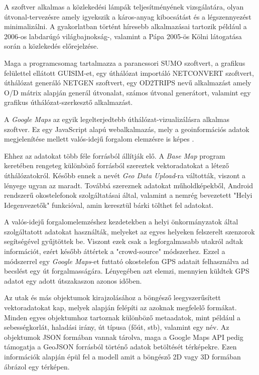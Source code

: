 A szoftver alkalmas a közlekedési lámpák teljesítményének vizsgálatára, olyan útvonal-tervezésre amely igyekszik a káros-anyag kibocsátást és a légszennyezést
minimalizálni. A gyakorlatban történt híresebb alkalmazásai tartozik például a 2006-os labdarúgó világbajnokság-, valamint a Pápa 2005-ös Kölni látogatása során a közlekedés előrejelzése.

Maga a programcsomag tartalmazza a parancssori SUMO szoftvert, a grafikus felülettel ellátott GUISIM-et, egy úthálózat importáló NETCONVERT szoftvert, úthálózat generáló NETGEN szoftvert, 
egy OD2TRIPS nevű alkalmazást amely O/D mátrix alapján generál útvonalat, számos útvonal generátort, valamint egy grafikus úthálózat-szerkesztő alkalmazást.


A \textit{Google Maps} az egyik legelterjedtebb úthálózat-vizualizálásra alkalmas szoftver. Ez egy JavaScript alapú webalkalmazás, mely a geoinformációs adatok megjelenítése
mellett valós-idejű forgalom elemzésre is képes \cite{mapsdoc}.

Ehhez az adatokat több féle forrásból állítják elő. A \textit{Base Map} program keretében rengeteg különböző forrásból
szereztek vektoradatokat a létező úthálózatokról. Később ennek a nevét \textit{Geo Data Upload}-ra váltották, viszont a lényege ugyan az maradt.
Továbbá szereznek adatokat műholdképekből, Android rendszerű okostelefonok szolgáltatásai által, valamint a nemrég bevezetett "Helyi Idegenvezetők" funkcióval, amin keresztül
bárki tölthet fel adatokat. 

A valós-idejű forgalomelemzéshez kezdetekben a helyi önkormányzatok által szolgáltatott adatokat használták, melyeket az egyes helyeken felszerelt
szenzorok segítségével gyűjtöttek be. Viszont ezek csak a legforgalmasabb utakról adtak információt, ezért később áttértek a "crowd-source" módszerhez. Ezzel a módszerrel egy
\textit{Google Maps}-et futtató okostelefon GPS adatait felhasználva ad becslést egy út forgalmasságára. Lényegében azt elemzi, mennyien küldtek GPS adatot egy adott útszakaszon azonos időben.

Az utak és más objektumok kirajzolásához a böngésző leegyszerűsített vektoradatokat kap, melyek alapján felépíti az azoknak megfelelő formákat.
Minden egyes objektumhoz tartoznak különböző metaadatok, mint például a sebességkorlát, haladási irány, út típusa (főút, stb), valamint egy név. Az objektumok JSON formában vannak
tárolva, maga a Google Maps API pedig támogatja a GeoJSON forrásból történő adatok betöltését térképekre.
Ezen információk alapján épül fel a modell amit a böngésző 2D vagy 3D formában ábrázol egy térképen.


